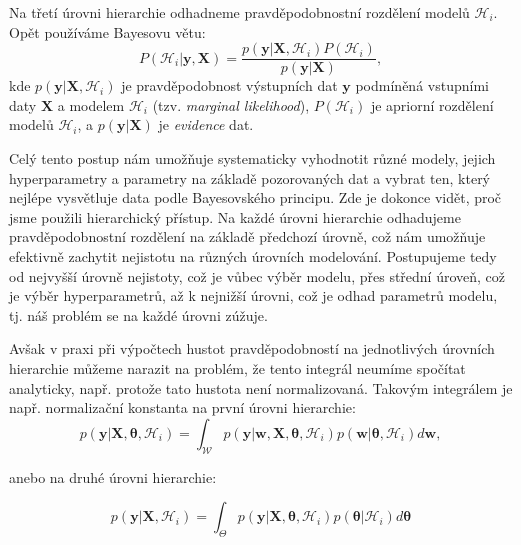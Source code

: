 Na třetí úrovni hierarchie odhadneme pravděpodobnostní rozdělení modelů $\mathcal{H}_i$.
Opět používáme Bayesovu větu:
\begin{equation}
  P(\mathcal{H}_i | \mathbf{y}, \mathbf{X}) = \frac{p( \mathbf{y} | \mathbf{X}, \mathcal{H}_i) P(\mathcal{H}_i)}{p(\mathbf{y} |\mathbf{X})},     
\end{equation}
kde $p( \mathbf{y} | \mathbf{X}, \mathcal{H}_i)$ je pravděpodobnost výstupních dat $\mathbf{y}$ podmíněná vstupními daty $\mathbf{X}$ a modelem $\mathcal{H}_i$ (tzv. \emph{marginal likelihood}), $P(\mathcal{H}_i)$ je apriorní rozdělení modelů $\mathcal{H}_i$, a $p(\mathbf{y} |\mathbf{X})$ je \emph{evidence} dat.
\par
Celý tento postup nám umožňuje systematicky vyhodnotit různé modely, jejich hyperparametry a parametry na základě pozorovaných dat a vybrat ten, který nejlépe vysvětluje data podle Bayesovského principu.
Zde je dokonce vidět, proč jsme použili hierarchický přístup.
Na každé úrovni hierarchie odhadujeme pravděpodobnostní rozdělení na základě předchozí úrovně, což nám umožňuje efektivně zachytit nejistotu na různých úrovních modelování.
Postupujeme tedy od nejvyšší úrovně nejistoty, což je vůbec výběr modelu, přes střední úroveň, což je výběr hyperparametrů, až k nejnižší úrovni, což je odhad parametrů modelu, tj. náš problém se na každé úrovni zúžuje. 
\par

Avšak v praxi při výpočtech hustot pravděpodobností na jednotlivých úrovních hierarchie můžeme narazit na problém, že tento integrál neumíme spočítat analyticky, např. protože tato hustota není normalizovaná.
Takovým integrálem je např. normalizační konstanta na první úrovni hierarchie:
\begin{equation}
  p(\mathbf{y} |\mathbf{X}, \boldsymbol{\theta}, \mathcal{H}_i) = \int_{\mathcal{W}} p( \mathbf{y} | \mathbf{w}, \mathbf{X}, \boldsymbol{\theta}, \mathcal{H}_i) p(\mathbf{w} | \boldsymbol{\theta}, \mathcal{H}_i) d\mathbf{w},
  \label{eq:normalizační_konst_1_uroven}
\end{equation}

anebo na druhé úrovni hierarchie:

\begin{equation}
  p(\mathbf{y} |\mathbf{X}, \mathcal{H}_i) = \int_{\Theta} p( \mathbf{y} | \mathbf{X}, \boldsymbol{\theta}, \mathcal{H}_i) p(\boldsymbol{\theta} | \mathcal{H}_i) d\boldsymbol{\theta}
  \label{eq:normalizační_konst_2_uroven}
\end{equation} 

